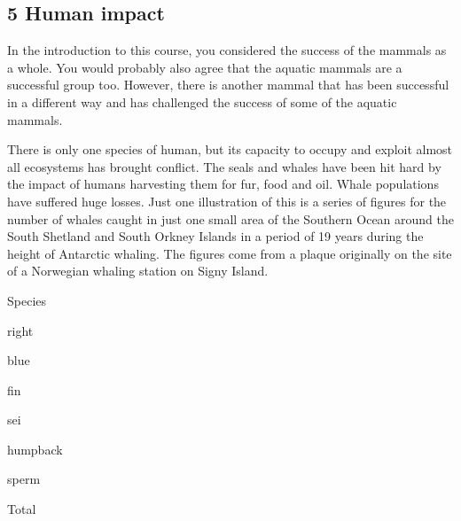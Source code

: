 \documentclass[letterpaper,10pt,english]{sphinxmanual}
\begin{document}
\subsection{5 Human impact}
\label{\detokenize{content/session_00/Part_00_05:5-Human-impact}}\label{\detokenize{content/session_00/Part_00_05::doc}}
In the introduction to this course, you considered the success of the mammals as a whole. You would probably also agree that the aquatic mammals are a successful group too. However, there is another mammal that has been successful in a different way and has challenged the success of some of the aquatic mammals.

There is only one species of human, but its capacity to occupy and exploit almost all ecosystems has brought conflict. The seals and whales have been hit hard by the impact of humans harvesting them for fur, food and oil. Whale populations have suffered huge losses. Just one illustration of this is a series of figures for the number of whales caught in just one small area of the Southern Ocean around the South Shetland and South Orkney Islands in a period of 19 years during the height of
Antarctic whaling. The figures come from a plaque originally on the site of a Norwegian whaling station on Signy Island.













Species





right





blue





fin





sei





humpback





sperm





Total
\end{document}

